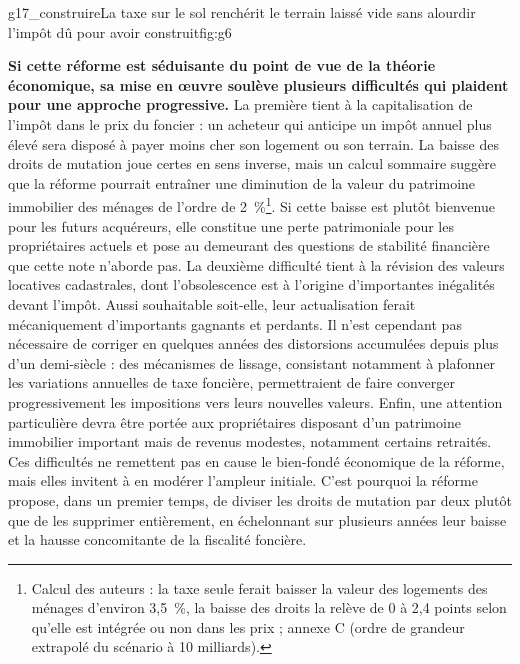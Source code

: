 \documentclass[10pt,a4paper]{article}
\begin{document}
%
{g17_construire}{La taxe sur le sol renchérit le terrain laissé vide sans alourdir l'impôt dû pour avoir construit}{fig:g6}

\textbf{Si cette réforme est séduisante du point de vue de la théorie économique, sa mise en œuvre soulève plusieurs difficultés qui plaident pour une approche progressive.} La première tient à la capitalisation de l’impôt dans le prix du foncier : un acheteur qui anticipe un impôt annuel plus élevé sera disposé à payer moins cher son logement ou son terrain. La baisse des droits de mutation joue certes en sens inverse, mais un calcul sommaire suggère que la réforme pourrait entraîner une diminution de la valeur du patrimoine immobilier des ménages de l’ordre de 2~\%\footnote{Calcul des auteurs : la taxe seule ferait baisser la valeur des logements des ménages d'environ 3,5~\%, la baisse des droits la relève de 0 à 2,4 points selon qu'elle est intégrée ou non dans les prix ; annexe C (ordre de grandeur extrapolé du scénario à 10 milliards).}. Si cette baisse est plutôt bienvenue pour les futurs acquéreurs, elle constitue une perte patrimoniale pour les propriétaires actuels et pose au demeurant des questions de stabilité financière que cette note n'aborde pas. La deuxième difficulté tient à la révision des valeurs locatives cadastrales, dont l’obsolescence est à l’origine d’importantes inégalités devant l’impôt. Aussi souhaitable soit-elle, leur actualisation ferait mécaniquement d’importants gagnants et perdants. Il n’est cependant pas nécessaire de corriger en quelques années des distorsions accumulées depuis plus d’un demi-siècle : des mécanismes de lissage, consistant notamment à plafonner les variations annuelles de taxe foncière, permettraient de faire converger progressivement les impositions vers leurs nouvelles valeurs. Enfin, une attention particulière devra être portée aux propriétaires disposant d’un patrimoine immobilier important mais de revenus modestes, notamment certains retraités. Ces difficultés ne remettent pas en cause le bien-fondé économique de la réforme, mais elles invitent à en modérer l’ampleur initiale. C’est pourquoi la réforme propose, dans un premier temps, de diviser les droits de mutation par deux plutôt que de les supprimer entièrement, en échelonnant sur plusieurs années leur baisse et la hausse concomitante de la fiscalité foncière.


\end{document}
